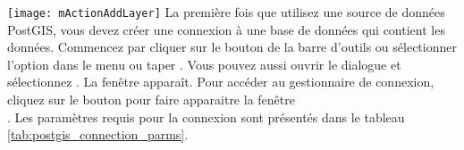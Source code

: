 \texttt{[image: mActionAddLayer]}
La première fois que utilisez une source de données PostGIS, vous devez créer une connexion à une base de données \psq qui contient les données. Commencez par cliquer sur le bouton  de la barre d'outils ou sélectionner l'option  dans le menu  ou taper . Vous pouvez aussi ouvrir le dialogue  et sélectionnez .
La fenêtre  apparaît. Pour accéder au gestionnaire de connexion, cliquez sur le bouton  pour faire apparaitre la fenêtre\\ . Les paramètres requis pour la connexion sont présentés dans le tableau \ref{tab:postgis_connection_parms}.

